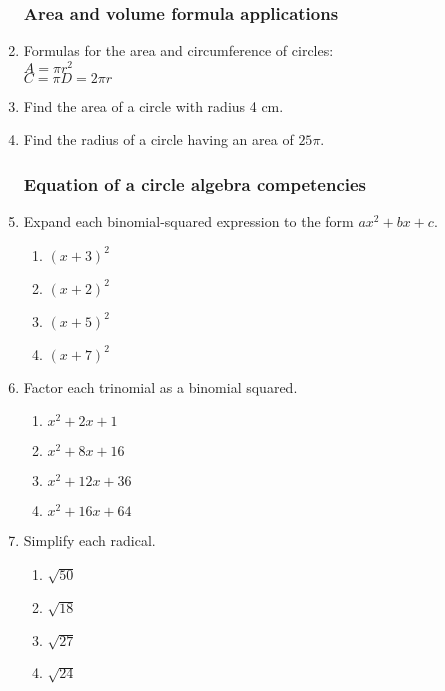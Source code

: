 \documentclass[12pt, twoside]{article}
\begin{document}
\begin{enumerate}
\subsubsection*{Area and volume formula applications}

\item Formulas for the area and circumference of circles:\\
$A=\pi r^2$\\
$C=\pi D = 2\pi r$

\item Find the area of a circle with radius 4 cm.
\item Find the radius of a circle having an area of $25 \pi$.


\newpage    
\subsubsection*{Equation of a circle algebra competencies} 

\item Expand each binomial-squared expression to the form $ax^2+bx+c$.
\begin{multicols}{2}
\begin{enumerate}[itemsep=2cm]
  \item $(x+3)^2$
  \item $(x+2)^2$ 
  \item $(x+5)^2$ 
  \item $(x+7)^2$ 
\end{enumerate}
\end{multicols}\vspace{2cm}

\item Factor each trinomial as a binomial squared.
\begin{multicols}{2}
  \begin{enumerate}[itemsep=2cm]
    \item $x^2+2x+1$ 
    \item $x^2+8x+16$
    \item $x^2+12x+36$ 
    \item $x^2+16x+64$ 
  \end{enumerate}
  \end{multicols}\vspace{2cm}

\item Simplify each radical.
\begin{multicols}{2}
  \begin{enumerate}[itemsep=2cm]
    \item $\sqrt{50}$ 
    \item $\sqrt{18}$
    \item $\sqrt{27}$ 
    \item $\sqrt{24}$ 
  \end{enumerate}
  \end{multicols}\vspace{2cm}
  

\end{enumerate}
\end{document}
